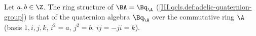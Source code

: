 Let $a,b\in\Z$. The ring structure of $\BA=\Bq_{\A}$ (\cref{III.qcls.def:adelic-quaternion-group}) is that of the quaternion algebra $\Bq_{\A}$ over the commutative ring
$\A$ (basis $1,i,j,k$, $i^2=a$, $j^2=b$, $ij=-ji=k$).
